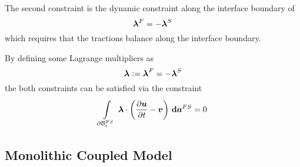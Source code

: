 The second constraint is the dynamic constraint along the interface boundary
of
\begin{equation}
  \vectr{\lambda}^{F}= -\vectr{\lambda}^{S} \label{eqn:FSIDynamicConstraint}
\end{equation}
which requires that the tractions balance along the interface boundary.

By defining some Lagrange multipliers as
\begin{equation}
  \boldsymbol{\lambda}:=\boldsymbol{\lambda}^{F}=-\boldsymbol{\lambda}^{S}
\end{equation}
the both constraints can be satisfied via the constraint
\begin{equation}
  \gint{\boundary{\embedmanifold{B}}^{FS}_{t}}{}{\dotprod{\vectr{\lambda}}{\pbrac{\delby{\vectr{u}}{t}-\vectr{v}}}}{\covectr{a}^{FS}}=0 \label{eqn:FSIConstraint}
\end{equation}

\subsection{Monolithic Coupled Model}

